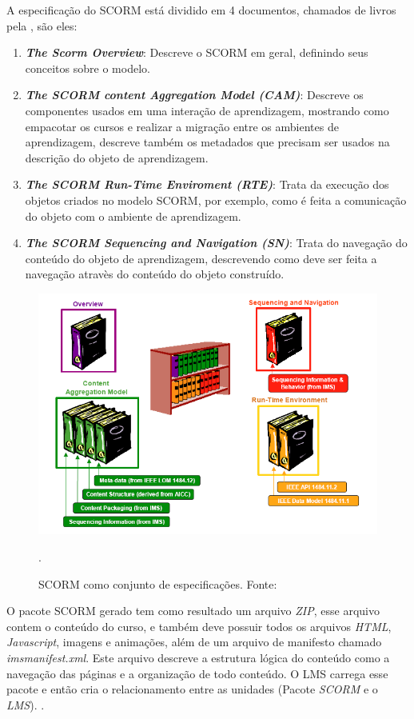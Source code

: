 A especificação do \ac{SCORM} está dividido em 4 documentos, chamados de livros pela \cite{adl}, são eles:
\begin{enumerate}
  \item \textbf{\textit{The Scorm Overview}}: Descreve o \ac{SCORM} em geral, definindo seus conceitos sobre o modelo.
  \item \textbf{\textit{The SCORM content Aggregation Model (CAM)}}: Descreve os componentes usados em uma interação de aprendizagem, mostrando como empacotar os cursos e realizar a migração entre os ambientes de aprendizagem, descreve também os metadados que precisam ser usados na descrição do objeto de aprendizagem.
  \item \textbf{\textit{The SCORM Run-Time Enviroment (RTE)}}: Trata da execução dos objetos criados no modelo \ac{SCORM}, por exemplo, como é feita a comunicação do objeto com o ambiente de aprendizagem.
  \item \textbf{\textit{The SCORM Sequencing and Navigation (SN)}}: Trata do navegação do conteúdo do objeto de aprendizagem, descrevendo como deve ser feita a navegação atravès do conteúdo do objeto construído.
\end{enumerate}

\begin{figure}[h]
  \centering
  \includegraphics[keepaspectratio=true,scale=0.7]{figuras/scorm-funcionamento-dutra.png}
  \caption{SCORM como conjunto de especificações. Fonte: }.
  \label{fig:scorm-funcionamento-dutra}
\end{figure}

O pacote \ac{SCORM} gerado tem como resultado um arquivo \textit{ZIP}, esse arquivo contem o conteúdo do curso, e também deve possuir todos os arquivos \textit{HTML}, \textit{Javascript}, imagens e animações, além de um arquivo de manifesto chamado \textit{imsmanifest.xml}. Este arquivo descreve a estrutura lógica do conteúdo como a navegação das páginas e a organização de todo conteúdo. O \ac{LMS} carrega esse pacote e então cria o relacionamento entre as unidades (Pacote \textit{SCORM} e o \textit{LMS}). \cite[p.~39]{fernandes-scorm}.

